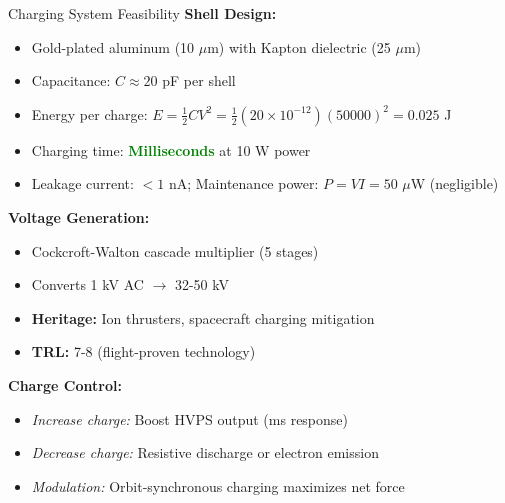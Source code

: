 \documentclass[aspectratio=169]{beamer}
\begin{document}
\begin{frame}{Charging System Feasibility}
\textbf{Shell Design:}
\begin{itemize}
    \item Gold-plated aluminum (10 $\mu$m) with Kapton dielectric (25 $\mu$m)
    \item Capacitance: $C \approx 20$ pF per shell
    \item Energy per charge: $E = \frac{1}{2}CV^2 = \frac{1}{2}(20 \times 10^{-12})(50000)^2 = 0.025$ J
    \item Charging time: \textcolor{green}{\textbf{Milliseconds}} at 10 W power
    \item Leakage current: $<1$ nA; Maintenance power: $P = VI = 50$ $\mu$W (negligible)
\end{itemize}

\vspace{0.3cm}
\textbf{Voltage Generation:}
\begin{itemize}
    \item Cockcroft-Walton cascade multiplier (5 stages)
    \item Converts 1 kV AC $\rightarrow$ 32-50 kV
    \item \textbf{Heritage:} Ion thrusters, spacecraft charging mitigation
    \item \textbf{TRL:} 7-8 (flight-proven technology)
\end{itemize}

\vspace{0.3cm}
\textbf{Charge Control:}
\begin{itemize}
    \item \textit{Increase charge:} Boost HVPS output (ms response)
    \item \textit{Decrease charge:} Resistive discharge or electron emission
    \item \textit{Modulation:} Orbit-synchronous charging maximizes net force
\end{itemize}
\end{frame}
\end{document}
